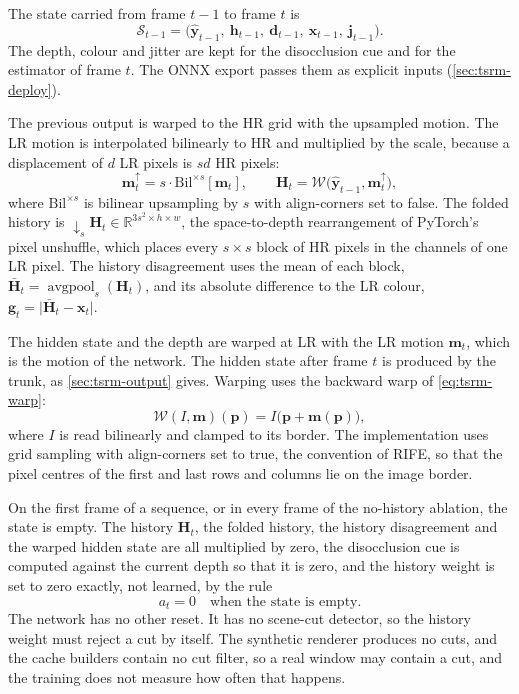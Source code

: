 The state carried from frame $t-1$ to frame $t$ is
\begin{equation}\label{eq:tsrm-state}
\mathcal{S}_{t-1}=\big(\hat{\mathbf{y}}_{t-1},\ \mathbf{h}_{t-1},\ \mathbf{d}_{t-1},\ \mathbf{x}_{t-1},\ \mathbf{j}_{t-1}\big).
\end{equation}
The depth, colour and jitter are kept for the disocclusion cue and for the estimator of frame $t$. The ONNX export passes them as explicit inputs (\cref{sec:tsrm-deploy}).

The previous output is warped to the HR grid with the upsampled motion. The LR motion is interpolated bilinearly to HR and multiplied by the scale, because a displacement of $d$ LR pixels is $sd$ HR pixels:
\begin{equation}\label{eq:tsrm-up-motion}
\mathbf{m}_t^{\uparrow}=s\cdot\mathrm{Bil}^{\times s}[\mathbf{m}_t],\qquad \mathbf{H}_t=\mathcal{W}\big(\hat{\mathbf{y}}_{t-1},\mathbf{m}_t^{\uparrow}\big),
\end{equation}
where $\mathrm{Bil}^{\times s}$ is bilinear upsampling by $s$ with align-corners set to false. The folded history is $\downarrow_s\mathbf{H}_t\in\mathbb{R}^{3s^2\times h\times w}$, the space-to-depth rearrangement of PyTorch's pixel unshuffle, which places every $s\times s$ block of HR pixels in the channels of one LR pixel. The history disagreement uses the mean of each block, $\bar{\mathbf{H}}_t=\operatorname{avgpool}_s(\mathbf{H}_t)$, and its absolute difference to the LR colour, $\mathbf{g}_t=\lvert\bar{\mathbf{H}}_t-\mathbf{x}_t\rvert$.

The hidden state and the depth are warped at LR with the LR motion $\mathbf{m}_t$, which is the motion of the network. The hidden state after frame $t$ is produced by the trunk, as \cref{sec:tsrm-output} gives. Warping uses the backward warp of \cref{eq:tsrm-warp}:
\begin{equation}\label{eq:tsrm-warp}
\mathcal{W}(I,\mathbf{m})(\mathbf{p})=I\big(\mathbf{p}+\mathbf{m}(\mathbf{p})\big),
\end{equation}
where $I$ is read bilinearly and clamped to its border. The implementation uses grid sampling with align-corners set to true, the convention of RIFE, so that the pixel centres of the first and last rows and columns lie on the image border.

On the first frame of a sequence, or in every frame of the no-history ablation, the state is empty. The history $\mathbf{H}_t$, the folded history, the history disagreement and the warped hidden state are all multiplied by zero, the disocclusion cue is computed against the current depth so that it is zero, and the history weight is set to zero exactly, not learned, by the rule
\begin{equation}\label{eq:tsrm-reset}
a_t=0\quad\text{when the state is empty.}
\end{equation}
The network has no other reset. It has no scene-cut detector, so the history weight must reject a cut by itself. The synthetic renderer produces no cuts, and the cache builders contain no cut filter, so a real window may contain a cut, and the training does not measure how often that happens.

